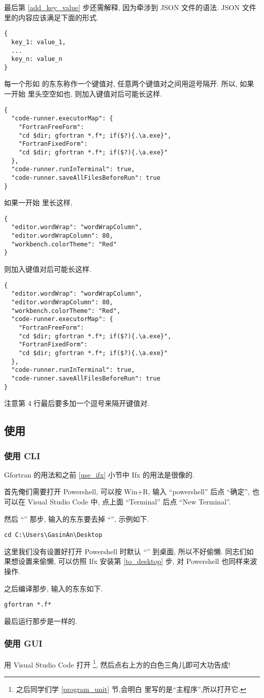 最后第 \ref{add_key_value} 步还需解释, 因为牵涉到 JSON 文件的语法. JSON 文件里的内容应该满足下面的形式.
\begin{verbatim}
{
  key_1: value_1,
  ...
  key_n: value_n
}
\end{verbatim}
每一个形如  的东东称作一个键值对, 任意两个键值对之间用逗号隔开. 所以, 如果一开始  里头空空如也, 则加入键值对后可能长这样.
\begin{verbatim}
{
  "code-runner.executorMap": {
    "FortranFreeForm":
    "cd $dir; gfortran *.f*; if($?){.\a.exe}",
    "FortranFixedForm":
    "cd $dir; gfortran *.f*; if($?){.\a.exe}"
  },
  "code-runner.runInTerminal": true,
  "code-runner.saveAllFilesBeforeRun": true
}
\end{verbatim}
如果一开始  里长这样,
\begin{verbatim}
{
  "editor.wordWrap": "wordWrapColumn",
  "editor.wordWrapColumn": 80,
  "workbench.colorTheme": "Red"
}
\end{verbatim}
则加入键值对后可能长这样.
\begin{verbatim}
{
  "editor.wordWrap": "wordWrapColumn",
  "editor.wordWrapColumn": 80,
  "workbench.colorTheme": "Red",
  "code-runner.executorMap": {
    "FortranFreeForm":
    "cd $dir; gfortran *.f*; if($?){.\a.exe}",
    "FortranFixedForm":
    "cd $dir; gfortran *.f*; if($?){.\a.exe}"
  },
  "code-runner.runInTerminal": true,
  "code-runner.saveAllFilesBeforeRun": true
}
\end{verbatim}
注意第 4 行最后要多加一个逗号来隔开键值对.

\subsection{使用}\label{use_gfortran}

\subsubsection{使用 CLI}

Gfortran 的用法和之前 \ref{use_ifx} 小节中 Ifx 的用法是很像的.

首先俺们需要打开 Powershell, 可以按 Win+R, 输入 ``powershell'' 后点 ``确定'', 也可以在 Visual Studio Code 中, 点上面 ``Terminal'' 后点 ``New Terminal''.

然后 ``'' 那步, 输入的东东要去掉 ``'', 示例如下.
\begin{verbatim}
cd C:\Users\GasinAn\Desktop
\end{verbatim}
这里我们没有设置好打开 Powershell 时默认 ``'' 到桌面, 所以不好偷懒. 同志们如果想设置来偷懒, 可以仿照 Ifx 安装第 \ref{to_desktop} 步, 对 Powershell 也同样来波操作.

之后编译那步, 输入的东东如下.
\begin{verbatim}
gfortran *.f*
\end{verbatim}

最后运行那步是一样的.

\subsubsection{使用 GUI}

用 Visual Studio Code 打开 \footnote{之后同学们学 \ref{program_unit} 节,会明白  里写的是``主程序'',所以打开它.}, 然后点右上方的白色三角儿即可大功告成!
